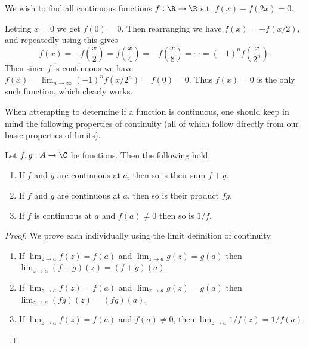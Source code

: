 \begin{example}
	We wish to find all continuous functions $f: \R \rightarrow \R$  s.t. $f(x) + f(2x) = 0$.

	Letting $x = 0$ we get $f(0) = 0$. Then rearranging we have
	$f(x) = -f(x/2)$, and repeatedly using this gives
	$$
	f(x) = -f\left(\frac{x}{2}\right) = f\left(\frac{x}{4}\right) = -f\left(\frac{x}{8}\right) = \cdots = (-1)^{n}f\left(\frac{x}{2^n}\right).
	$$
	Then since $f$ is continuous we have $f(x) = \lim_{n \to \infty} (-1)^n f(x/2^n) = f(0) = 0$. Thus $f(x) = 0$ is the only such function, which clearly works.
\end{example}


When attempting to determine if a function is continuous, one should keep in mind the following properties of continuity (all of which follow directly from our basic properties of limits).

\begin{proposition}
	Let $f, g: A \rightarrow \C$ be functions. Then the following hold.
	\begin{enumerate}[label=(\roman*)]
		\item If $f$ and $g$ are continuous at $a$, then so is their sum $f + g$.
		\item If $f$ and $g$ are continuous at $a$, then so is their product $fg$.
		\item If $f$ is continuous at $a$ and $f(a) \neq 0$ then so is $1/f$.
	\end{enumerate}
\end{proposition}
\begin{proof}
	We prove each individually using the limit definition of continuity.
	\begin{enumerate}[label=(\roman*)]
		\item If $\displaystyle\lim_{z \to a} f(z) = f(a)$ and $\displaystyle\lim_{z \to a} g(z) = g(a)$ then $\displaystyle\lim_{z \to a} (f+g)(z) = (f+g)(a)$.
		\item If $\displaystyle\lim_{z \to a} f(z) = f(a)$ and $\displaystyle\lim_{z \to a} g(z) = g(a)$ then $\displaystyle\lim_{z \to a} (fg)(z) = (fg)(a)$.
		\item If $\displaystyle\lim_{z \to a} f(z) = f(a)$ and $f(a) \neq 0$, then $\displaystyle\lim_{z \to a} 1/f(z) = 1/f(a)$.
		 \qedhere
	\end{enumerate}
\end{proof}

